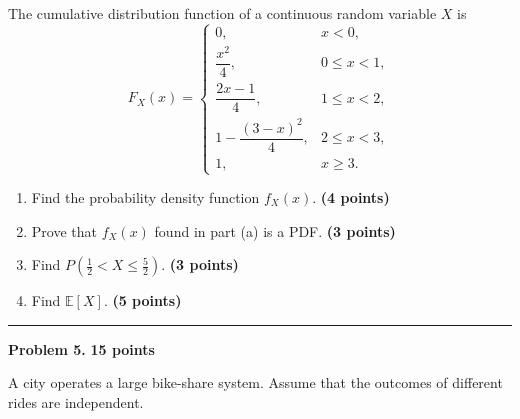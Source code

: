 \documentclass[11pt]{article}
\begin{document}
The cumulative distribution function of a continuous random variable $X$ is
\[
F_X(x)=
\begin{cases}
0, & x<0,\\[1mm]
\dfrac{x^2}{4}, & 0\leq x<1,\\[2mm]
\dfrac{2x-1}{4}, & 1\leq x<2,\\[2mm]
1-\dfrac{(3-x)^2}{4}, & 2\leq x<3,\\[2mm]
1, & x\geq 3.
\end{cases}
\]

\begin{enumerate}[label=(\alph*),leftmargin=*,itemsep=0.75em]
    \item Find the probability density function $f_X(x)$. \hfill \textbf{(4 points)}
    \item Prove that $f_X(x)$ found in part (a) is a PDF. \hfill \textbf{(3 points)}
    \item Find $P\!\left(\frac12<X\leq\frac52\right)$. \hfill \textbf{(3 points)}
    \item Find $\mathbb{E}[X]$. \hfill \textbf{(5 points)}
\end{enumerate}

\vspace{2mm}\hrule
\newpage




 
\newpage
\begin{problemheader}
\textbf{Problem 5. } 
\hfill \textbf{15 points}
\end{problemheader}

A city operates a large bike-share system. Assume that the outcomes of
different rides are independent.
\end{document}
